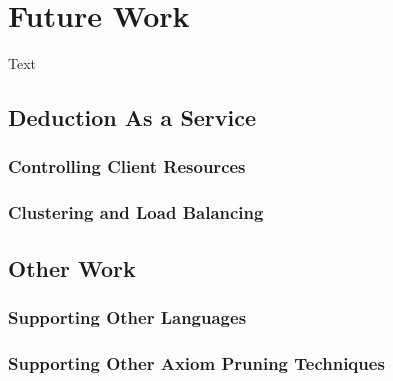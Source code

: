 \chapter{Future Work}
\label{chap:todo}
Text

  \section{Deduction As a Service}
    \subsection{Controlling Client Resources}
    \subsection{Clustering and Load Balancing}

  \section{Other Work}
    \subsection{Supporting Other Languages}
    \subsection{Supporting Other Axiom Pruning Techniques}

